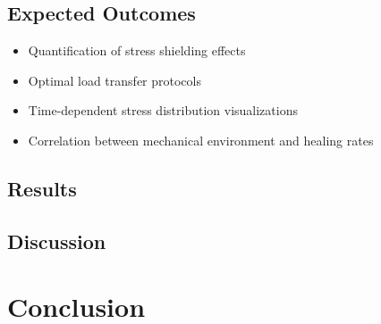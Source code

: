 \documentclass{article}
\begin{document}
\subsection{Expected Outcomes}
\begin{itemize}
  \item Quantification of stress shielding effects
  \item Optimal load transfer protocols
  \item Time-dependent stress distribution visualizations
  \item Correlation between mechanical environment and healing rates
\end{itemize}

\subsection{Results}

\subsection{Discussion}

\section{Conclusion}

\citep{kour2014real} %







\end{document}
